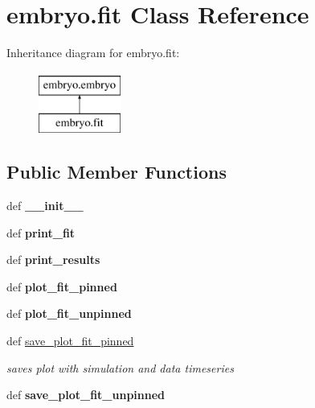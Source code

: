 \hypertarget{classembryo_1_1fit}{\section{embryo.\+fit Class Reference}
\label{classembryo_1_1fit}
}
Inheritance diagram for embryo.\+fit\+:\begin{figure}[H]
\begin{center}
\leavevmode
\includegraphics[height=2.000000cm]{classembryo_1_1fit}
\end{center}
\end{figure}
\subsection*{Public Member Functions}
\begin{DoxyCompactItemize}
\item 
\hypertarget{classembryo_1_1fit_aa0928c5edcffbaf495383e1d3e4cbadc}{def {\bfseries \+\_\+\+\_\+init\+\_\+\+\_\+}}\label{classembryo_1_1fit_aa0928c5edcffbaf495383e1d3e4cbadc}

\item 
\hypertarget{classembryo_1_1fit_ab0e8628e65a8a7559c5858cce9e830a8}{def {\bfseries print\+\_\+fit}}\label{classembryo_1_1fit_ab0e8628e65a8a7559c5858cce9e830a8}

\item 
\hypertarget{classembryo_1_1fit_af091775791ed6273b1f32544db3744ac}{def {\bfseries print\+\_\+results}}\label{classembryo_1_1fit_af091775791ed6273b1f32544db3744ac}

\item 
\hypertarget{classembryo_1_1fit_a549bcaa42b6fe95f866e2d9079921dfd}{def {\bfseries plot\+\_\+fit\+\_\+pinned}}\label{classembryo_1_1fit_a549bcaa42b6fe95f866e2d9079921dfd}

\item 
\hypertarget{classembryo_1_1fit_ad013922f972a1c98ce29476eb91deff6}{def {\bfseries plot\+\_\+fit\+\_\+unpinned}}\label{classembryo_1_1fit_ad013922f972a1c98ce29476eb91deff6}

\item 
\hypertarget{classembryo_1_1fit_a2336e12b8a2a2f175f9ea9c75cda7426}{def \hyperlink{classembryo_1_1fit_a2336e12b8a2a2f175f9ea9c75cda7426}{save\+\_\+plot\+\_\+fit\+\_\+pinned}}\label{classembryo_1_1fit_a2336e12b8a2a2f175f9ea9c75cda7426}

\begin{DoxyCompactList}\small\item\em saves plot with simulation and data timeseries \end{DoxyCompactList}\item 
\hypertarget{classembryo_1_1fit_a817798d47a6e35f9680e78e6fae2264d}{def {\bfseries save\+\_\+plot\+\_\+fit\+\_\+unpinned}}\label{classembryo_1_1fit_a817798d47a6e35f9680e78e6fae2264d}

\end{DoxyCompactItemize}
